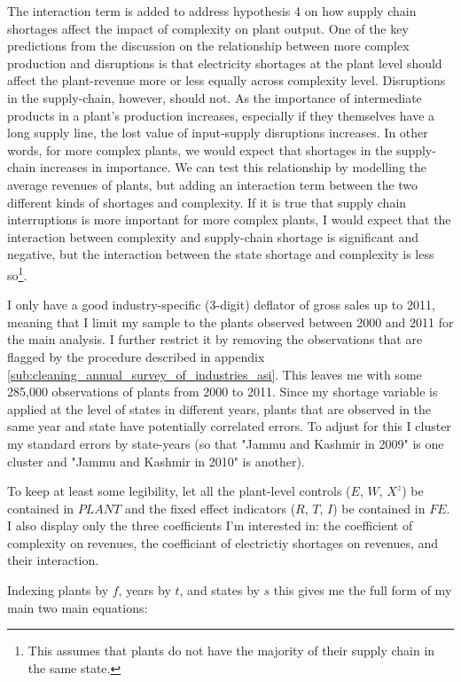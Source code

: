 \documentclass[11pt]{article}
\begin{document}
The interaction term is added to address hypothesis 4 on how supply chain shortages affect the impact of complexity on plant output. One of the key predictions from the discussion on the relationship between more complex production and disruptions is that electricity shortages at the plant level should affect the plant-revenue more or less equally across complexity level. Disruptions in the supply-chain, however, should not. As the importance of intermediate products in a plant's production increases, especially if they themselves have a long supply line, the lost value of input-supply disruptions increases. In other words, for more complex plants, we would expect that shortages in the supply-chain increases in importance. We can test this relationship by modelling the average revenues of plants, but adding an interaction term between the two different kinds of shortages and complexity. If it is true that supply chain interruptions is more important for more complex plants, I would expect that the interaction between complexity and supply-chain shortage is significant and negative, but the interaction between the state shortage and complexity is less so\footnote{This assumes that plants do not have the majority of their supply chain in the same state.}.

I only have a good industry-specific (3-digit) deflator of gross sales up to 2011, meaning that I limit my sample to the plants observed between 2000 and 2011 for the main analysis. I further restrict it by removing the observations that are flagged by the procedure described in appendix \ref{sub:cleaning_annual_survey_of_industries_asi}. This leaves me with some 285,000 observations of plants from 2000 to 2011. Since my shortage variable is applied at the level of states in different years, plants that are observed in the same year and state have potentially correlated errors. To adjust for this I cluster my standard errors by state-years (so that "Jammu and Kashmir in 2009" is one cluster and "Jammu and Kashmir in 2010" is another).

To keep at least some legibility, let all the plant-level controls ($E$, $W$, $X^{z}$) be contained in $PLANT$ and the fixed effect indicators ($R$, $T$, $I$) be contained in $FE$. I also display only the three coefficients I'm interested in: the coefficient of complexity on revenues, the coefficiant of electrictiy shortages on revenues, and their interaction.

Indexing plants by $f$, years by $t$, and states by $s$ this gives me the full form of my main two main equations:
\end{document}

